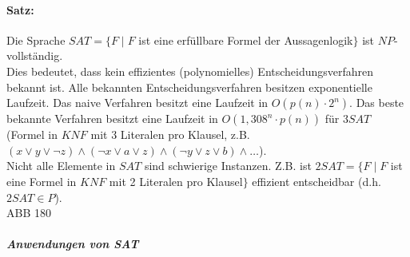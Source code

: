 \paragraph{Satz:} Die Sprache $SAT=\{F\;|\; F$ ist eine erfüllbare Formel der Aussagenlogik$\}$ ist $NP$-vollständig.\\
Dies bedeutet, dass kein effizientes (polynomielles) Entscheidungsverfahren bekannt ist. Alle bekannten Entscheidungsverfahren besitzen exponentielle Laufzeit. Das naive Verfahren besitzt eine Laufzeit in $O(p(n)\cdot 2^n)$. Das beste bekannte Verfahren besitzt eine Laufzeit in $O(1,308^n\cdot p(n))$ für $3 SAT$ (Formel in $KNF$ mit 3 Literalen pro Klausel, z.B. $(x\vee y \vee \neg z ) \wedge (\neg x \vee a \vee z) \wedge (\neg y \vee z \vee b) \wedge \dots$).\\
Nicht alle Elemente in $SAT$ sind schwierige Instanzen. Z.B. ist $2 SAT=\{F\;|\; F$ ist eine Formel in $KNF$ mit 2 Literalen pro Klausel$\}$ effizient entscheidbar (d.h. $2 SAT \in P$).\\
ABB 180
\subparagraph{Anwendungen von SAT} 
